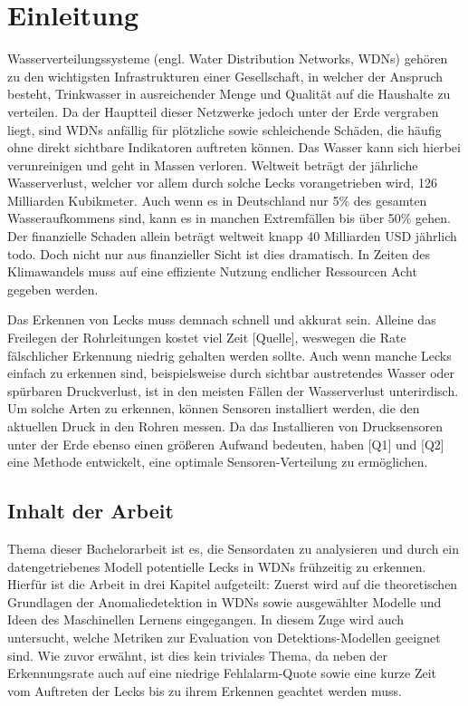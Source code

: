 \chapter{Einleitung}

Wasserverteilungssysteme (engl. Water Distribution Networks, WDNs) gehören zu den wichtigsten Infrastrukturen
 einer Gesellschaft, in welcher der Anspruch besteht, Trinkwasser in ausreichender Menge und Qualität auf die
 Haushalte zu verteilen. Da der Hauptteil dieser Netzwerke jedoch unter der Erde vergraben liegt, sind WDNs
 anfällig für plötzliche sowie schleichende Schäden, die häufig ohne direkt sichtbare Indikatoren
 auftreten können. Das Wasser kann sich hierbei verunreinigen und geht in Massen verloren. Weltweit beträgt
 der jährliche Wasserverlust, welcher vor allem durch solche Lecks vorangetrieben wird, 126 Milliarden
 Kubikmeter. Auch wenn es in Deutschland nur 5\% des gesamten Wasseraufkommens sind, kann es in manchen
 Extremfällen bis über 50\% gehen. Der finanzielle Schaden allein beträgt weltweit knapp 40 Milliarden USD
 jährlich todo. Doch nicht nur aus finanzieller Sicht ist dies dramatisch. In Zeiten des Klimawandels
 muss auf eine effiziente Nutzung endlicher Ressourcen Acht gegeben werden.

Das Erkennen von Lecks muss demnach schnell und akkurat sein. Alleine das Freilegen der Rohrleitungen kostet viel
 Zeit [Quelle], weswegen die Rate fälschlicher Erkennung niedrig gehalten werden sollte. Auch wenn manche Lecks
 einfach zu erkennen sind, beispielsweise durch sichtbar austretendes Wasser oder spürbaren Druckverlust, ist in
 den meisten Fällen der Wasserverlust unterirdisch. Um solche Arten zu erkennen, können Sensoren installiert
 werden, die den aktuellen Druck in den Rohren messen. Da das Installieren von Drucksensoren unter der Erde
 ebenso einen größeren Aufwand bedeuten, haben [Q1] und [Q2] eine Methode entwickelt, eine optimale
 Sensoren-Verteilung zu ermöglichen.

\section*{Inhalt der Arbeit}

Thema dieser Bachelorarbeit ist es, die Sensordaten zu analysieren und durch ein datengetriebenes Modell
 potentielle Lecks in WDNs frühzeitig zu erkennen. Hierfür ist die Arbeit in drei Kapitel aufgeteilt:
 Zuerst wird auf die theoretischen Grundlagen der Anomaliedetektion in WDNs sowie ausgewählter Modelle und
 Ideen des Maschinellen Lernens eingegangen.
In diesem Zuge wird auch untersucht, welche Metriken zur Evaluation von Detektions-Modellen geeignet sind.
Wie zuvor erwähnt, ist dies kein triviales Thema, da neben der Erkennungsrate auch auf eine niedrige
 Fehlalarm-Quote sowie eine kurze Zeit vom Auftreten der Lecks bis zu ihrem Erkennen geachtet werden muss.

